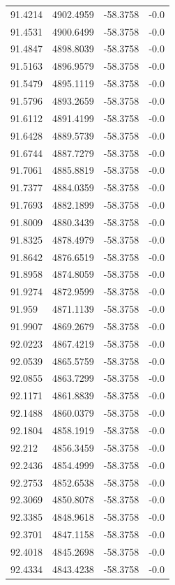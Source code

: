 \begin{table}[H]
\begin{tabular}{llll}
91.4214 & 4902.4959 & -58.3758 & -0.0 \\
91.4531 & 4900.6499 & -58.3758 & -0.0 \\
91.4847 & 4898.8039 & -58.3758 & -0.0 \\
91.5163 & 4896.9579 & -58.3758 & -0.0 \\
91.5479 & 4895.1119 & -58.3758 & -0.0 \\
91.5796 & 4893.2659 & -58.3758 & -0.0 \\
91.6112 & 4891.4199 & -58.3758 & -0.0 \\
91.6428 & 4889.5739 & -58.3758 & -0.0 \\
91.6744 & 4887.7279 & -58.3758 & -0.0 \\
91.7061 & 4885.8819 & -58.3758 & -0.0 \\
91.7377 & 4884.0359 & -58.3758 & -0.0 \\
91.7693 & 4882.1899 & -58.3758 & -0.0 \\
91.8009 & 4880.3439 & -58.3758 & -0.0 \\
91.8325 & 4878.4979 & -58.3758 & -0.0 \\
91.8642 & 4876.6519 & -58.3758 & -0.0 \\
91.8958 & 4874.8059 & -58.3758 & -0.0 \\
91.9274 & 4872.9599 & -58.3758 & -0.0 \\
91.959 & 4871.1139 & -58.3758 & -0.0 \\
91.9907 & 4869.2679 & -58.3758 & -0.0 \\
92.0223 & 4867.4219 & -58.3758 & -0.0 \\
92.0539 & 4865.5759 & -58.3758 & -0.0 \\
92.0855 & 4863.7299 & -58.3758 & -0.0 \\
92.1171 & 4861.8839 & -58.3758 & -0.0 \\
92.1488 & 4860.0379 & -58.3758 & -0.0 \\
92.1804 & 4858.1919 & -58.3758 & -0.0 \\
92.212 & 4856.3459 & -58.3758 & -0.0 \\
92.2436 & 4854.4999 & -58.3758 & -0.0 \\
92.2753 & 4852.6538 & -58.3758 & -0.0 \\
92.3069 & 4850.8078 & -58.3758 & -0.0 \\
92.3385 & 4848.9618 & -58.3758 & -0.0 \\
92.3701 & 4847.1158 & -58.3758 & -0.0 \\
92.4018 & 4845.2698 & -58.3758 & -0.0 \\
92.4334 & 4843.4238 & -58.3758 & -0.0 \\

\end{tabular}
\end{table}
